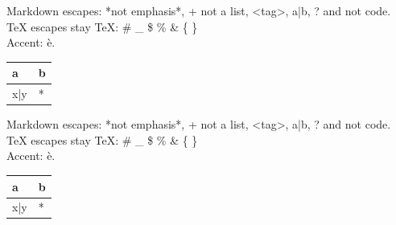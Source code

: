 \begin{frame}[t]
Markdown escapes: *not emphasis*, + not a list, <tag>, a|b, ? and \textasciigrave{}not code\textasciigrave{}.
TeX escapes stay TeX: \# \_ \$ \% \& \{ \} \- \\
Accent: \`{e}.

\par\addvspace{\medskipamount}
\noindent\begin{tabularx}{\linewidth}{@{}>{\raggedright\arraybackslash}X>{\raggedright\arraybackslash}X@{}}
\toprule
a & b \\
\midrule
x|y & * \\
\bottomrule
\end{tabularx}
\par\addvspace{\medskipamount}
\end{frame}

\begin{frame}[t]
Markdown escapes: *not emphasis*, + not a list, <tag>, a|b, ? and \textasciigrave{}not code\textasciigrave{}.
TeX escapes stay TeX: \# \_ \$ \% \& \{ \} \- \\
Accent: \`{e}.

\par\addvspace{\medskipamount}
\noindent\begin{tabularx}{\linewidth}{@{}>{\raggedright\arraybackslash}X>{\raggedright\arraybackslash}X@{}}
\toprule
a & b \\
\midrule
x|y & * \\
\bottomrule
\end{tabularx}
\par\addvspace{\medskipamount}
\end{frame}

